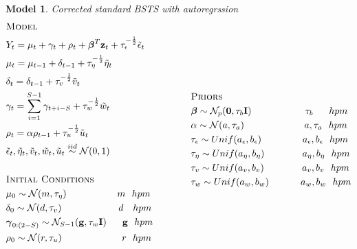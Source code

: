 \documentclass[11pt,twoside]{report}
\newtheorem{model}{Model}
\begin{document}
\begin{model} Corrected standard BSTS with autoregrssion
	\begin{equation*}
	\begin{aligned}
	&\textsc{Model}\\
	&Y_t = \mu_t + \gamma_t + \rho_t + \boldsymbol{\beta}^T\mathbf{z}_t + \tau_\epsilon^{-\frac{1}{2}}\tilde{\epsilon}_t\\
	&\mu_t = \mu_{t-1} + \delta_{t-1} +\tau_\eta^{-\frac{1}{2}}\tilde{\eta}_t\\
	&\delta_t = \delta_{t-1} + \tau_v^{-\frac{1}{2}}\tilde{v}_t\\
	&\gamma_t = \sum_{i=1}^{S-1}\gamma_{t+i-S} + \tau_w^{-\frac{1}{2}}\tilde{w}_t\\
	&\rho_t = \alpha\rho_{t-1} + \tau_u^{-\frac{1}{2}}\tilde{u}_t\\
	&\tilde{\epsilon}_t, \tilde{\eta}_t, \tilde{v}_t, \tilde{w}_t, \tilde{u}_t \overset{iid}{\sim} \mathcal{N}(0,1)\\
	\\
	&\textsc{Initial Conditions}\\
	&\mu_0 \sim \mathcal{N}(m, \tau_\eta)\quad \quad \quad \quad \quad\  m\ \ hpm\\
	&\delta_0 \sim \mathcal{N}(d, \tau_v)\quad \quad \quad \quad \quad \quad d\ \ \ hpm\\
	&\boldsymbol{\gamma}_{0:(2-S)} \sim \mathcal{N}_{S-1}(\mathbf{g}, \tau_w\mathbf{I})\quad\ \ \mathbf{g}\ \ hpm\\
	&\rho_0 \sim \mathcal{N}(r, \tau_u)\quad \quad \quad \quad \quad \quad \ r\ \ hpm\\
	\\
\end{aligned}
\qquad \qquad
\begin{aligned}[c]
	&\textsc{Priors}\\
	&\boldsymbol{\beta} \sim \mathcal{N}_p(\mathbf{0}, \tau_b \mathbf{I})\ \ \quad \quad \quad \quad \quad \tau_b\ \quad \ hpm\\
	&\alpha \sim \mathcal{N}(a, \tau_a) \ \quad \quad \quad \quad \quad \quad a, \tau_a\ \ hpm\\
	&\tau_\epsilon \sim Unif(a_\epsilon, b_\epsilon)\quad\quad\ \quad \quad a_\epsilon, b_\epsilon\ \ hpm\\
	&\tau_\eta \sim Unif(a_\eta, b_\eta)\quad\quad\quad \quad a_\eta, b_\eta\ \ hpm\\
	&\tau_v \sim Unif(a_v, b_v)\quad\quad\quad \quad a_v, b_v\ \ hpm\\
	&\tau_w\sim Unif(a_w, b_w)\quad\quad\quad\ a_w, b_w\ \ hpm\\

\end{aligned}
\end{equation*}
\end{model}
\end{document}
